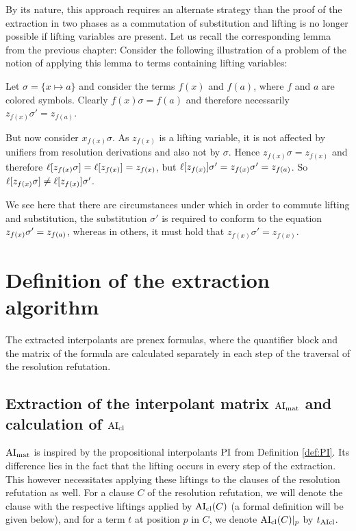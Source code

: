 \documentclass[,%
	draft=false,%
	numbers=noendperiod
	oneside,openany
	a4paper,
	11pt,
]{memoir}
\begin{document}
By its nature, this approach requires an alternate strategy than the proof of the extraction in two phases as a commutation of substitution and lifting is no longer possible if lifting variables are present.
Let us recall the corresponding lemma from the previous chapter:
\lemmaCommutLiftSubst*
Consider the following illustration of a problem of the notion of applying this lemma to terms containing lifting variables:

\begin{exa}
	Let $\sigma = \{x \mapsto a\}$
	and consider the terms $f(x)$ and $f(a)$, where $f$ and $a$ are colored symbols.
	Clearly $f(x)\sigma = f(a)$ and therefore necessarily $z_{f(x)}\sigma' = z_{f(a)}$.

	But now consider $x_{f(x)} \sigma$.
	As $z_{f(x)}$ is a lifting variable, it is not affected by unifiers from resolution derivations and also not by $\sigma$.
	Hence $z_{f(x)}\sigma = z_{f(x)}$ and therefore $\ell[z_{f(x)}\sigma] = \ell[z_{f(x)}] = z_{f(x)}$, but $\ell[z_{f(x)}]\sigma' = z_{f(x)}\sigma' = z_{f(a)}$.
	So $\ell[z_{f(x)}\sigma] \neq \ell[z_{f(x)}]\sigma'$.

	We see here that there are circumstances under which in order to commute lifting and substitution,
	the substitution $\sigma'$ is required to conform to the equation
	$z_{f(x)}\sigma' =\nolinebreak z_{f(a)}$, 
	whereas in others, it must hold that
	$z_{f(x)}\sigma' = z_{f(x)}$.
\end{exa}


\section{Definition of the extraction algorithm}

The extracted interpolants are prenex formulas, where 
the quantifier block and the matrix of the formula are calculated separately in each step of the traversal of the resolution refutation.


\subsection{Extraction of the interpolant matrix $\operatorname{AI}_\mathrm{mat}$ and calculation of $\operatorname{AI}_\mathrm{cl}$}

$\operatorname{AI}_\mathrm{mat}$ is inspired by the propositional interpolants $\operatorname{PI}$ from Definition \ref{def:PI}.
Its difference lies in the fact that the lifting occurs in every step of the extraction.
This however necessitates applying these liftings to the clauses of the resolution refutation as well.
For a clause $C$ of the resolution refutation, we will denote the clause with the respective liftings applied by $\operatorname{AI}_\mathrm{cl}(C)$ (a formal definition will be given below), and for a term $t$ at position $p$ in $C$, we denote $\operatorname{AI}_\mathrm{cl}(C)|_{p}$ by $t_{\operatorname{AIcl}}$.
\end{document}
